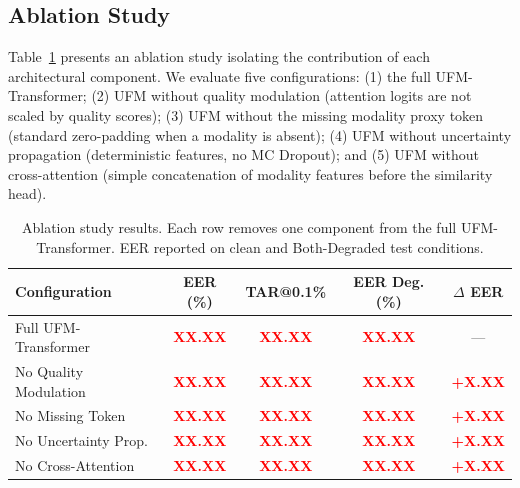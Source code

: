 \documentclass[10pt,journal,compsoc]{IEEEtran}
\begin{document}
\subsection{Ablation Study}
\label{subsec:ablation}

Table~\ref{tab:ablation} presents an ablation study isolating the contribution of each architectural component. We evaluate five configurations: (1) the full UFM-Transformer; (2) UFM without quality modulation (attention logits are not scaled by quality scores); (3) UFM without the missing modality proxy token (standard zero-padding when a modality is absent); (4) UFM without uncertainty propagation (deterministic features, no MC Dropout); and (5) UFM without cross-attention (simple concatenation of modality features before the similarity head).

\begin{table}[htbp]
\centering
\caption{Ablation study results. Each row removes one component from the full UFM-Transformer. EER reported on clean and Both-Degraded test conditions.}
\label{tab:ablation}
\begin{tabular}{l c c c c}
\hline
\textbf{Configuration} & \textbf{EER (\%)} & \textbf{TAR@0.1\%} & \textbf{EER Deg. (\%)} & $\Delta$ \textbf{EER} \\
\hline
Full UFM-Transformer & \textcolor{red}{\textbf{XX.XX}} & \textcolor{red}{\textbf{XX.XX}} & \textcolor{red}{\textbf{XX.XX}} & --- \\ %
No Quality Modulation & \textcolor{red}{\textbf{XX.XX}} & \textcolor{red}{\textbf{XX.XX}} & \textcolor{red}{\textbf{XX.XX}} & \textcolor{red}{\textbf{+X.XX}} \\ %
No Missing Token & \textcolor{red}{\textbf{XX.XX}} & \textcolor{red}{\textbf{XX.XX}} & \textcolor{red}{\textbf{XX.XX}} & \textcolor{red}{\textbf{+X.XX}} \\ %
No Uncertainty Prop. & \textcolor{red}{\textbf{XX.XX}} & \textcolor{red}{\textbf{XX.XX}} & \textcolor{red}{\textbf{XX.XX}} & \textcolor{red}{\textbf{+X.XX}} \\ %
No Cross-Attention & \textcolor{red}{\textbf{XX.XX}} & \textcolor{red}{\textbf{XX.XX}} & \textcolor{red}{\textbf{XX.XX}} & \textcolor{red}{\textbf{+X.XX}} \\ %
\hline
\end{tabular}
\end{table}
\end{document}
